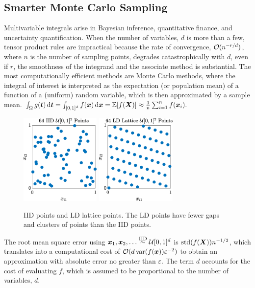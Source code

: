 \subsection{Smarter Monte Carlo Sampling}

Multivariable integrals arise in Bayesian inference, quantitative finance, and uncertainty quantification.  When the number of variables, $d$ is more than a few, tensor product rules are impractical because the rate of convergence, $\mathcal{O}(n^{-r/d})$, where $n$ is the number of sampling points, degrades catastrophically with $d$, even if $r$, the smoothness of the integrand and the associate method is substantial.  The most computationally efficient methods are Monte Carlo methods, where the integral of interest is interpreted as the expectation (or population mean) of a function of a (uniform) random variable, which is then approximated by a sample mean.
$
    \int_{\Omega} g({\boldsymbol{t}}) \, \textup{d} {\boldsymbol{t}} = \int_{[0,1]^d} f({\boldsymbol{x}}) \, \textup{d} {\boldsymbol{x}} = \mathbb{E}[f({\boldsymbol{X}})] \approx \frac 1n \sum_{i=1}^n f({\boldsymbol{x}}_i).
$

 \begin{figure}
	\centering
	\includegraphics[height = 4.5cm]{IIDPoints.eps} \quad
	\includegraphics[height = 4.5cm]{ShiftedLatticePoints.eps}
	\caption{IID points and LD lattice points.  The LD points have fewer gaps and clusters of points than the IID points. \label{fig:iid_vs_ld}}
\end{figure}


The root mean square error using ${\boldsymbol{x}}_1, {\boldsymbol{x}}_2, \ldots \overset{\text{IID}}{\sim} {\mathcal{U}}[0,1]^d$ is $\operatorname{std}(f({\boldsymbol{X}})) n^{-1/2}$, which translates into a computational cost of $\mathcal{O}(d\operatorname{var}(f({\boldsymbol{x}}))\varepsilon^{-2})$ to obtain an approximation with absolute error no greater than $\varepsilon$. The term $d$ accounts for the cost of evaluating $f$, which is assumed to be proportional to the number of variables, $d$.



